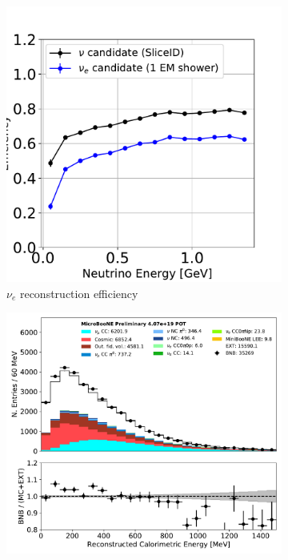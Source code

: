 \begin{figure}[H] 
\begin{center}
    \begin{subfigure}[b]{0.3\textwidth}
    \centering
    \includegraphics[width=1.00\textwidth]{nureco/nureco_RUN1.pdf}
    \caption{\label{fig:nuereco:eff} $\nu_e$ reconstruction efficiency}
    \end{subfigure}
    \begin{subfigure}[b]{0.31\textwidth}
    \centering
    \includegraphics[width=1.00\textwidth]{nureco/NeutrinoEnergy2_01152020.pdf}

\end{subfigure}
\end{center}
\end{figure}
